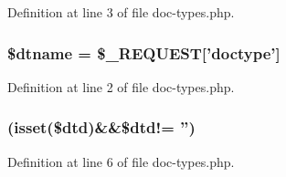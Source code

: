\-Definition at line 3 of file doc-\/types.\-php.

\hypertarget{doc-types_8php_acac5ac47805ec48a296b31e0463716df}{
\subsubsection[{\$dtname}]{\setlength{\rightskip}{0pt plus 5cm}\$dtname = \$\-\_\-\-R\-E\-Q\-U\-E\-S\-T\mbox{[}'doctype'\mbox{]}}}\label{doc-types_8php_acac5ac47805ec48a296b31e0463716df}


\-Definition at line 2 of file doc-\/types.\-php.

\hypertarget{doc-types_8php_a527aa2b84ffedbe59a0cf6ea4f373cc7}{
\subsubsection[{if}]{(isset(\$dtd)\&\&\$dtd!= '')}}\label{doc-types_8php_a527aa2b84ffedbe59a0cf6ea4f373cc7}


\-Definition at line 6 of file doc-\/types.\-php.

